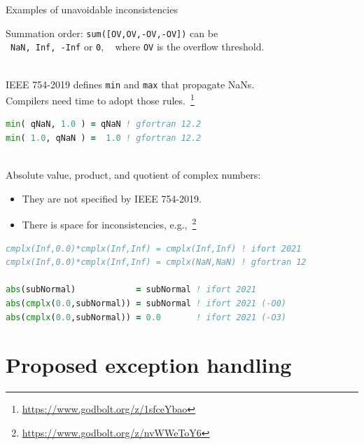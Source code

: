 \documentclass[11pt]{beamer}
\newcommand{\cpp}{{C\texttt{++}}}
\begin{document}

\begin{frame}[fragile]{Examples of unavoidable inconsistencies}

	Summation order: \texttt{sum([OV,OV,-OV,-OV])} can be\\
	~\texttt{NaN, Inf, -Inf} or \texttt{0}, ~ where \texttt{OV} is the overflow threshold.

	
	~\\
	IEEE 754-2019 defines \texttt{min} and \texttt{max} that propagate NaNs.\\
	Compilers need time to adopt those rules.~\footnote{\url{https://www.godbolt.org/z/1sfceYbao}}
	\begin{lstlisting}[language=Fortran]
min( qNaN, 1.0 ) = qNaN ! gfortran 12.2
min( 1.0, qNaN ) =  1.0 ! gfortran 12.2\end{lstlisting}
	
	~\\
	Absolute value, product, and quotient of complex numbers:
	\begin{itemize}
		\item They are not specified by IEEE 754-2019.
		\item There is space for inconsistencies, e.g.,~\footnote{\url{https://www.godbolt.org/z/nvWWeToY6}}
	\end{itemize}
	\begin{lstlisting}[language=Fortran]
cmplx(Inf,0.0)*cmplx(Inf,Inf) = cmplx(Inf,Inf) ! ifort 2021
cmplx(Inf,0.0)*cmplx(Inf,Inf) = cmplx(NaN,NaN) ! gfortran 12

abs(subNormal)            = subNormal ! ifort 2021
abs(cmplx(0.0,subNormal)) = subNormal ! ifort 2021 (-O0)
abs(cmplx(0.0,subNormal)) = 0.0       ! ifort 2021 (-O3)\end{lstlisting}

\end{frame}

\section{Proposed exception handling}
\end{document}

